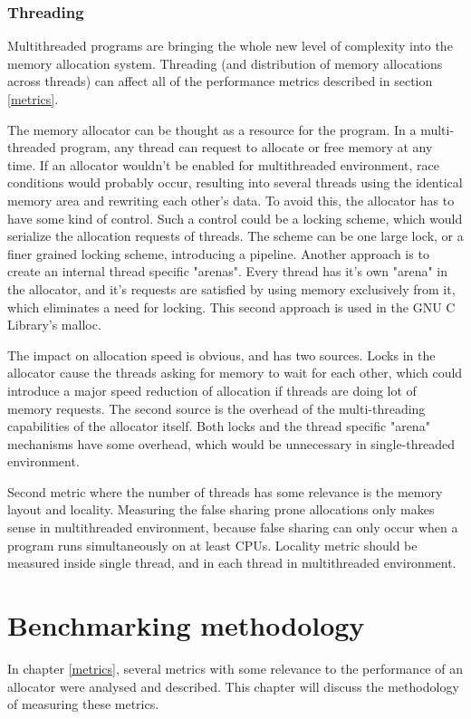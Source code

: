 \subsection{Threading}

Multithreaded programs are bringing the whole new level of complexity into the memory allocation system. Threading (and distribution of memory allocations across threads) can affect all of the performance metrics described in section \ref{metrics}. 

The memory allocator can be thought as a resource for the program. In a multi-threaded program, any thread can request to allocate or free memory at any time. If an allocator wouldn't be enabled for multithreaded environment, race conditions would probably occur, resulting into several threads using the identical memory area and rewriting each other's data. To avoid this, the allocator has to have some kind of control. Such a control could be a locking scheme, which would serialize the allocation requests of threads. The scheme can be one large lock, or a finer grained locking scheme, introducing a pipeline. Another approach is to create an internal thread specific "arenas". Every thread has it's own "arena" in the allocator, and it's requests are satisfied by using memory exclusively from it, which eliminates a need for locking. This second approach is used in the GNU C Library's malloc.

The impact on allocation speed is obvious, and has two sources. Locks in the allocator cause the threads asking for memory to wait for each other, which could introduce a major speed reduction of allocation if threads are doing lot of memory requests. The second source is the overhead of the multi-threading capabilities of the allocator itself. Both locks and the thread specific "arena" mechanisms have some overhead, which would be unnecessary in single-threaded environment.

Second metric where the number of threads has some relevance is the memory layout and locality. Measuring the false sharing prone allocations only makes sense in multithreaded environment, because false sharing can only occur when a program runs simultaneously on at least CPUs. Locality metric should be measured inside single thread, and in each thread in multithreaded environment.
\chapter{Benchmarking methodology}
\label{methodology}
In chapter \ref{metrics}, several metrics with some relevance to the performance of an allocator were analysed and described. This chapter will discuss the methodology of measuring these metrics.

